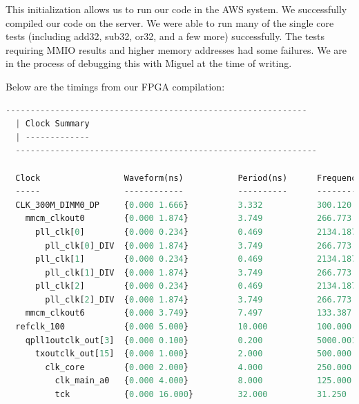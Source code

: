 \documentclass{article}
\begin{document}
This initialization allows us to run our code in the AWS system. We successfully compiled our code on the server. We were able to run many of the single core tests (including add32, sub32, or32, and a few more) successfully. The tests requiring MMIO results and higher memory addresses had some failures.
 We are in the process of debugging this with Miguel at the time of writing. 

 Below are the timings from our FPGA compilation:
 \begin{lstlisting}[language=Python]
  -------------------------------------------------------------
  | Clock Summary
  | -------------
  -------------------------------------------------------------
  
  Clock                 Waveform(ns)           Period(ns)      Frequency(MHz)
  -----                 ------------           ----------      --------------
  CLK_300M_DIMM0_DP     {0.000 1.666}          3.332           300.120         
    mmcm_clkout0        {0.000 1.874}          3.749           266.773         
      pll_clk[0]        {0.000 0.234}          0.469           2134.187        
        pll_clk[0]_DIV  {0.000 1.874}          3.749           266.773         
      pll_clk[1]        {0.000 0.234}          0.469           2134.187        
        pll_clk[1]_DIV  {0.000 1.874}          3.749           266.773         
      pll_clk[2]        {0.000 0.234}          0.469           2134.187        
        pll_clk[2]_DIV  {0.000 1.874}          3.749           266.773         
    mmcm_clkout6        {0.000 3.749}          7.497           133.387         
  refclk_100            {0.000 5.000}          10.000          100.000         
    qpll1outclk_out[3]  {0.000 0.100}          0.200           5000.001        
      txoutclk_out[15]  {0.000 1.000}          2.000           500.000         
        clk_core        {0.000 2.000}          4.000           250.000         
          clk_main_a0   {0.000 4.000}          8.000           125.000         
          tck           {0.000 16.000}         32.000          31.250          
\end{lstlisting}
\end{document}
